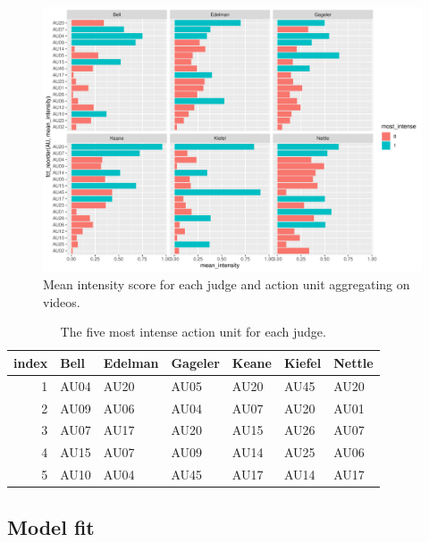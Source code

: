 \documentclass{monashthesis}
\begin{document}
\begin{figure}

{\centering \includegraphics[width=1\linewidth]{figures/unnamed-chunk-16-1} 

}

\caption{Mean intensity score for each judge and action unit aggregating on videos.\label{fig:mean_intensity}}\label{fig:unnamed-chunk-16}
\end{figure}

\begin{table}

\caption{\label{tab:unnamed-chunk-17}\label{tab:most_intense}The five most intense action unit for each judge.}
\centering
\begin{tabular}[t]{r|l|l|l|l|l|l}
\hline
index & Bell & Edelman & Gageler & Keane & Kiefel & Nettle\\
\hline
1 & AU04 & AU20 & AU05 & AU20 & AU45 & AU20\\
\hline
2 & AU09 & AU06 & AU04 & AU07 & AU20 & AU01\\
\hline
3 & AU07 & AU17 & AU20 & AU15 & AU26 & AU07\\
\hline
4 & AU15 & AU07 & AU09 & AU14 & AU25 & AU06\\
\hline
5 & AU10 & AU04 & AU45 & AU17 & AU14 & AU17\\
\hline
\end{tabular}
\end{table}

\hypertarget{model-fit}{%
\subsection{Model fit}\label{model-fit}}
\end{document}
